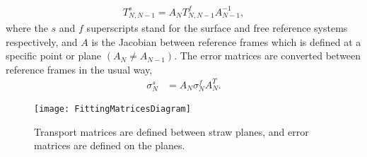     \begin{align} \label{eq:Ttransform}
        T_{N,N-1}^{s} = A_{N} T_{N,N-1}^{f} A_{N-1}^{-1},
    \end{align}
where the $s$ and $f$ superscripts stand for the surface and free reference systems respectively, and $A$ is the Jacobian between reference frames which is defined at a specific point or plane $(A_{N} \neq A_{N-1})$. The error matrices are converted between reference frames in the usual way, 
    \begin{align} \label{eq:Sigtransform}
        \sigma_{N}^{s} &= A_{N} \sigma_{N}^{f} A_{N}^{T}.
    \end{align}


\begin{figure}[]
  \centering
  \texttt{[image: FittingMatricesDiagram]}
    \caption[Transport and error matrices for straw tracker planes]{Transport matrices are defined between straw planes, and error matrices are defined on the planes.}
    \label{fig:FittingMatricesDiagram}
\end{figure}



